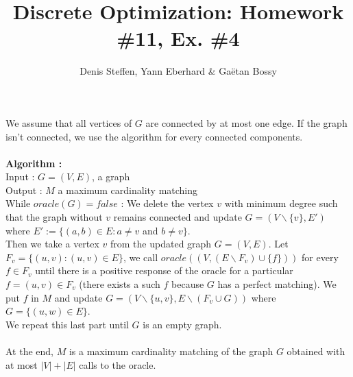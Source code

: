 \documentclass[a4paper,11pt,french]{article}
\title{Discrete Optimization: Homework \#11, Ex. \#4}
\author{Denis Steffen, Yann Eberhard \& Gaëtan Bossy}
\begin{document}
    
    \maketitle

    We assume that all vertices of $G$ are connected by at most one edge.  If the graph isn't connected, we use the algorithm for every connected components.\\\\
    
    
    \textbf{Algorithm :} \\
    Input : $G=(V,E)$, a graph \\
     Output : $M$ a maximum cardinality matching\\
    
    
    
    While $oracle(G)=false$ : We delete the vertex $v$ with minimum degree such that the graph without $v$ remains connected and update $G=(V\backslash{\{v\}},E')$ where $E' := \{(a,b) \in E : a\neq  v$ and $b \neq v \}$.\\
    
    
   Then we take a vertex $v$ from the updated graph $G=(V,E)$. Let $F_{v}=\{(u,v) : (u,v) \in E\}$, we call $oracle( (V,(E\backslash F_{v} ) \cup \{f\}))$ for every $f \in F_{v}$ until there is a positive response of the oracle for a particular $f=(u,v) \in F_{v}$ (there exists a such $f$ because $G$ has a perfect matching). We put $f$ in $M$ and update $G=(V\backslash \{u,v\},E\backslash (F_{v} \cup G))$ where $G=\{(u,w) \in E\}$. \\
   We repeat this last part until $G$ is an empty graph. \\\\ 
 
At the end, $M$ is a maximum cardinality matching of the graph $G$ obtained with at most $|V|+|E|$ calls to the oracle.
  
\end{document}
